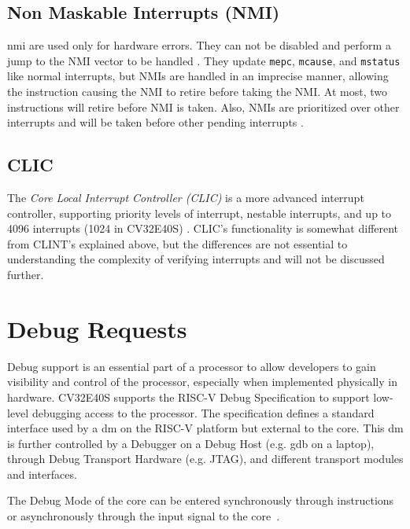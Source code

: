 \subsection{Non Maskable Interrupts (NMI)}

\acrfull{nmi} are used only for hardware errors. They can not be disabled and perform a jump to the NMI vector to be handled \cite{watermanRISCVInstructionSet2021}. They update \mbox{\lstinline{mepc}}, \lstinline{mcause}, and \lstinline{mstatus} like normal interrupts, but NMIs are handled in an imprecise manner, allowing the instruction causing the NMI to retire before taking the NMI. At most, two instructions will retire before NMI is taken. 
Also, NMIs are prioritized over other interrupts and will be taken before other pending interrupts \cite{openhwgroupExceptionsInterruptsCOREV2023}.

\subsection{CLIC}

The \textit{Core Local Interrupt Controller (CLIC)} is a more advanced interrupt controller, supporting priority levels of interrupt, nestable interrupts, and up to 4096 interrupts (1024 in CV32E40S) \cite{openhwgroupExceptionsInterruptsCOREV2023}. CLIC's functionality is somewhat different from CLINT's explained above, but the differences are not essential to understanding the complexity of verifying interrupts and will not be discussed further. 



\section{Debug Requests}
\label{sec:bg_debug}

Debug support is an essential part of a processor to allow developers to gain visibility and control of the processor, especially when implemented physically in hardware. CV32E40S supports the RISC-V Debug Specification \cite{pauldonahueRISCVDebugSupport2023} to support low-level debugging access to the processor. The specification defines a standard interface used by a \acrfull{dm} on the RISC-V platform but external to the core. This \acrshort{dm} is further controlled by a Debugger on a Debug Host (e.g. gdb on a laptop), through Debug Transport Hardware (e.g. JTAG), and different transport modules and interfaces. 

The Debug Mode of the core can be entered synchronously through  instructions or asynchronously through the  input signal to the core~\cite{openhwgroupDebugTriggerCOREV2023}.

